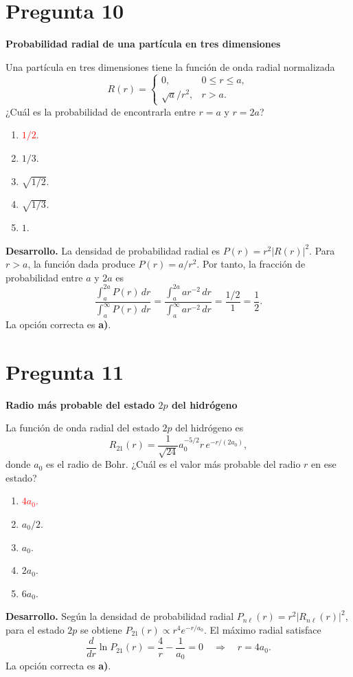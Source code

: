 \documentclass[a4paper,11pt]{article}
\newcommand{\pregunta}[2]{\section*{Pregunta #1}\textbf{#2}\par}
\begin{document}
\pregunta{10}{Probabilidad radial de una partícula en tres dimensiones}

Una partícula en tres dimensiones tiene la función de onda radial normalizada
\[
R(r)=
\begin{cases}
0, & 0\leq r\leq a,\\
\sqrt{a}/r^2, & r>a.
\end{cases}
\]
¿Cuál es la probabilidad de encontrarla entre $r=a$ y $r=2a$?

\begin{enumerate}
    \item \textcolor{red}{$1/2$.}
    \item $1/3$.
    \item $\sqrt{1/2}$.
    \item $\sqrt{1/3}$.
    \item $1$.
\end{enumerate}

\textbf{Desarrollo.} La densidad de probabilidad radial es $P(r)=r^2|R(r)|^2$. Para $r>a$, la función dada produce $P(r)=a/r^2$. Por tanto, la fracción de probabilidad entre $a$ y $2a$ es
\[
\frac{\displaystyle\int_a^{2a}P(r)\,dr}{\displaystyle\int_a^{\infty}P(r)\,dr}
=\frac{\displaystyle\int_a^{2a}a r^{-2}\,dr}{\displaystyle\int_a^{\infty}a r^{-2}\,dr}
=\frac{1/2}{1}=\frac12.
\]
La opción correcta es \textbf{a)}. \parencite[Sec. 20.5, ecs. (20.77)--(20.79), pp. 679--680]{chaparro2026}

\pregunta{11}{Radio más probable del estado $2p$ del hidrógeno}

La función de onda radial del estado $2p$ del hidrógeno es
\[
R_{21}(r)=\frac{1}{\sqrt{24}}a_0^{-5/2}r\,e^{-r/(2a_0)},
\]
donde $a_0$ es el radio de Bohr. ¿Cuál es el valor más probable del radio $r$ en ese estado?

\begin{enumerate}
    \item \textcolor{red}{$4a_0$.}
    \item $a_0/2$.
    \item $a_0$.
    \item $2a_0$.
    \item $6a_0$.
\end{enumerate}

\textbf{Desarrollo.} Según la densidad de probabilidad radial $P_{n\ell}(r)=r^2|R_{n\ell}(r)|^2$, para el estado $2p$ se obtiene $P_{21}(r)\propto r^4e^{-r/a_0}$. El máximo radial satisface
\[
\frac{d}{dr}\ln P_{21}(r)=\frac{4}{r}-\frac{1}{a_0}=0
\quad\Longrightarrow\quad r=4a_0.
\]
La opción correcta es \textbf{a)}. \parencite[Sec. 20.4, ec. (20.67), pp. 675--676; Sec. 20.5, ecs. (20.77)--(20.78), pp. 679--680]{chaparro2026}
\end{document}
